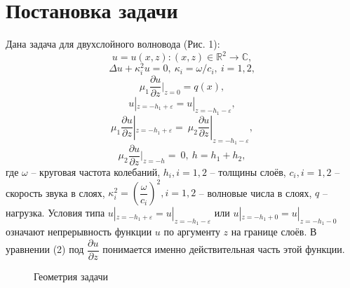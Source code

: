 \documentclass[a4paper, 12pt]{article}
\begin{document}
\section{Постановка задачи}
Дана задача для двухслойного волновода (Рис. 1):
$$u=u(x,z): (x,z) \in \mathbb{R}^2 \rightarrow \mathbb{C},$$
\begin{equation} 
    \Delta u + \kappa_i^2 u=0,\ \kappa_i=\omega/c_i,\ i=1,2,
\end{equation}
\begin{equation}
    \mu_1 \frac{\partial u}{\partial z}|_{z=0}=q(x),
\end{equation}
\begin{equation}
    u|_{z=-h_1+\varepsilon}=u|_{z=-h_1-\varepsilon},
\end{equation}
\begin{equation}
    \mu_1 \frac{\partial u}{\partial z}|_{z=-h_1+\varepsilon}=\ \mu_2 \frac{\partial u}{\partial z}|_{z=-h_1-\varepsilon},
\end{equation}
\begin{equation}
    \mu_2 \frac{\partial u}{\partial z}|_{z=-h}=\ 0,\ h=h_1+h_2,
\end{equation}
где $\omega$ -- круговая частота колебаний, $h_i, i=1, 2$ -- толщины слоёв, $c_i, i=1, 2$ -- скорость звука в слоях, $\kappa_i^2=\left(\dfrac{\omega}{c_i} \right)^2, i=1, 2$ -- волновые числа в слоях, $q$ -- нагрузка. Условия типа $ u|_{z=-h_1+\varepsilon}=u|_{z=-h_1-\varepsilon}$ или $ u|_{z=-h_1+0}=u|_{z=-h_1-0}$ означают непрерывность функции $u$ по аргументу $z$ на границе слоёв. В уравнении (2) под $\dfrac{\partial u}{\partial z}$ понимается именно действительная часть этой функции.
\begin{figure}[h!]
\noindent{}
\caption{Геометрия задачи}
\label{figCurves}
\end{figure} 
\end{document}
